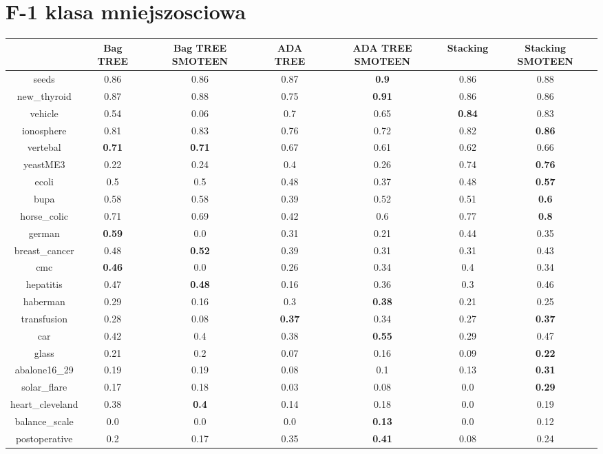 \documentclass{article}%
\begin{document}
\section*{F{-}1 klasa mniejszosciowa}%
\begin{tabular}{c|cccccc}%
&Bag TREE&Bag TREE SMOTEEN&ADA TREE&ADA TREE SMOTEEN&Stacking&Stacking SMOTEEN\\%
\hline%
seeds&0.86&0.86&0.87&\textbf{0.9}&0.86&0.88\\%
new\_thyroid&0.87&0.88&0.75&\textbf{0.91}&0.86&0.86\\%
vehicle&0.54&0.06&0.7&0.65&\textbf{0.84}&0.83\\%
ionosphere&0.81&0.83&0.76&0.72&0.82&\textbf{0.86}\\%
vertebal&\textbf{0.71}&\textbf{0.71}&0.67&0.61&0.62&0.66\\%
yeastME3&0.22&0.24&0.4&0.26&0.74&\textbf{0.76}\\%
ecoli&0.5&0.5&0.48&0.37&0.48&\textbf{0.57}\\%
bupa&0.58&0.58&0.39&0.52&0.51&\textbf{0.6}\\%
horse\_colic&0.71&0.69&0.42&0.6&0.77&\textbf{0.8}\\%
german&\textbf{0.59}&0.0&0.31&0.21&0.44&0.35\\%
breast\_cancer&0.48&\textbf{0.52}&0.39&0.31&0.31&0.43\\%
cmc&\textbf{0.46}&0.0&0.26&0.34&0.4&0.34\\%
hepatitis&0.47&\textbf{0.48}&0.16&0.36&0.3&0.46\\%
haberman&0.29&0.16&0.3&\textbf{0.38}&0.21&0.25\\%
transfusion&0.28&0.08&\textbf{0.37}&0.34&0.27&\textbf{0.37}\\%
car&0.42&0.4&0.38&\textbf{0.55}&0.29&0.47\\%
glass&0.21&0.2&0.07&0.16&0.09&\textbf{0.22}\\%
abalone16\_29&0.19&0.19&0.08&0.1&0.13&\textbf{0.31}\\%
solar\_flare&0.17&0.18&0.03&0.08&0.0&\textbf{0.29}\\%
heart\_cleveland&0.38&\textbf{0.4}&0.14&0.18&0.0&0.19\\%
balance\_scale&0.0&0.0&0.0&\textbf{0.13}&0.0&0.12\\%
postoperative&0.2&0.17&0.35&\textbf{0.41}&0.08&0.24\\%
\end{tabular}

%
\end{document}
